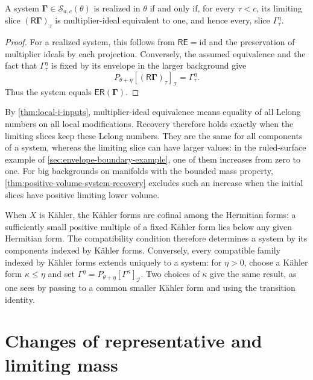 \begin{proposition}\label{prop:hermitian-system-realization-criterion}
A system $\boldsymbol\Gamma\in\mathscr S_{a,c}(\theta)$ is realized in $\theta$ if and only if, for every $\tau<c$, its limiting slice $(\mathsf R\boldsymbol\Gamma)_\tau$ is multiplier-ideal equivalent to one, and hence every, slice $\Gamma^\eta_\tau$.
\end{proposition}
\begin{proof}
For a realized system, this follows from $\mathsf R\mathsf E=\mathrm{id}$ and the preservation of multiplier ideals by each projection. Conversely, the assumed equivalence and the fact that $\Gamma^\eta_\tau$ is fixed by its envelope in the larger background give
\[
 P_{\theta+\eta}[(\mathsf R\boldsymbol\Gamma)_\tau]_{\mathcal I}
                       =\Gamma^\eta_\tau.
\]
Thus the system equals $\mathsf E\mathsf R(\boldsymbol\Gamma)$.
\end{proof}

By \cref{thm:local-i-inputs}, multiplier-ideal equivalence means equality of all Lelong numbers on all local modifications. Recovery therefore holds exactly when the limiting slices keep these Lelong numbers. They are the same for all components of a system, whereas the limiting slice can have larger values: in the ruled-surface example of \cref{sec:envelope-boundary-example}, one of them increases from zero to one. For big backgrounds on manifolds with the bounded mass property, \cref{thm:positive-volume-system-recovery} excludes such an increase when the initial slices have positive limiting lower volume.

When $X$ is K\"ahler, the K\"ahler forms are cofinal among the Hermitian forms: a sufficiently small positive multiple of a fixed K\"ahler form lies below any given Hermitian form. The compatibility condition therefore determines a system by its components indexed by K\"ahler forms. Conversely, every compatible family indexed by K\"ahler forms extends uniquely to a system: for $\eta>0$, choose a K\"ahler form $\kappa\leq\eta$ and set $\Gamma^\eta=P_{\theta+\eta}[\Gamma^\kappa]_{\mathcal I}$. Two choices of $\kappa$ give the same result, as one sees by passing to a common smaller K\"ahler form and using the transition identity.

\section{Changes of representative and limiting mass}\label{sec:system-gauge-mass}

